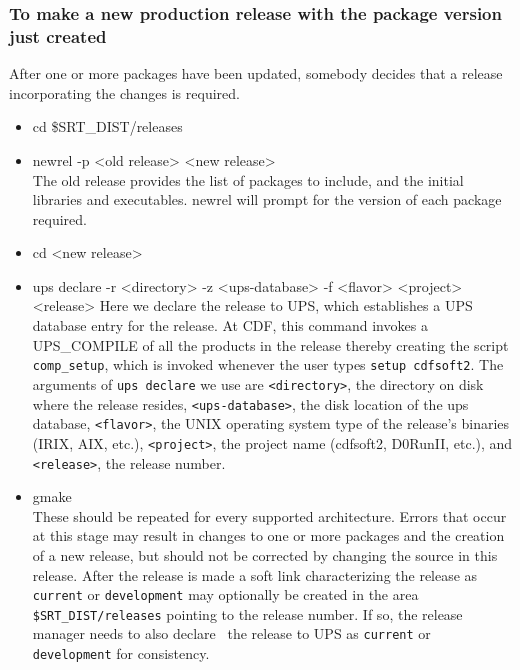 \documentclass[12pt]{article}
\begin{document}
\subsubsection{To make a new production release with the package version 
just created}
\label{sec_newrel}
After one or more packages  have been updated, somebody decides that a release
incorporating the changes is required.
\begin{itemize}
\item {\ttfamily cd \$SRT\_DIST/releases}
\item {\ttfamily newrel -p <old release> <new release>}\\
The old release provides the list of packages to include, and the initial 
libraries and executables. {\ttfamily newrel} will prompt for the version of
each package  required. 
\item {\ttfamily cd <new release>}
\item {\ttfamily ups declare -r <directory> -z <ups-database> -f <flavor> <project> <release>}
Here we declare the release to UPS, which establishes a UPS database entry for
the release. At CDF, this command invokes a 
UPS\_COMPILE of all 
the products in the release thereby creating the script \texttt{comp\_setup}, 
which is invoked whenever the user types \texttt{setup cdfsoft2}. 
The arguments of \texttt{ups declare} we use are \texttt{<directory>}, the 
directory on disk where the release resides, \texttt{<ups-database>}, the
disk location of the ups database, \texttt{<flavor>}, the UNIX operating system 
type of the release's binaries (IRIX, AIX, etc.), \texttt{<project>}, the 
project name (cdfsoft2, D0RunII, etc.), and \texttt{<release>}, the release 
number.
\item {\ttfamily gmake}\\
These should be repeated for every supported architecture.  Errors that occur
at this stage may result in changes to one or more packages and the creation
of a new release, but should not be corrected by changing the source in this
release. After the release is made a soft link characterizing the release as
\texttt{current} or \texttt{development} may optionally be created in the
area \texttt{\$SRT\_DIST/releases} pointing to the release number.  If so, the
release manager needs to also declare~ the release to UPS 
as \texttt{current} or \texttt{development} for consistency.
\end{itemize}
\end{document}
